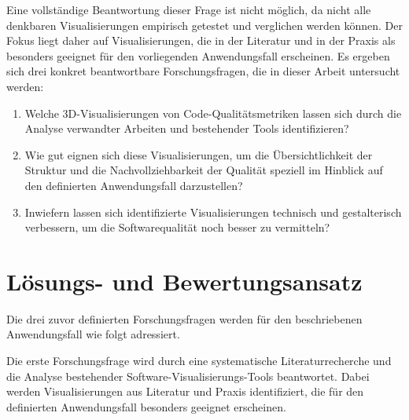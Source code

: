 Eine vollständige Beantwortung dieser Frage ist nicht möglich, da nicht alle denkbaren Visualisierungen empirisch getestet und verglichen werden können. Der Fokus liegt daher auf Visualisierungen, die in der Literatur und in der Praxis als besonders geeignet für den vorliegenden Anwendungsfall erscheinen. Es ergeben sich drei konkret beantwortbare Forschungsfragen, die in dieser Arbeit untersucht werden:
\begin{enumerate}
    \item Welche 3D-Visualisierungen von Code-Qualitätsmetriken lassen sich durch die Analyse verwandter Arbeiten und bestehender Tools identifizieren?
    \item Wie gut eignen sich diese Visualisierungen, um die Übersichtlichkeit der Struktur und die Nachvollziehbarkeit der Qualität speziell im Hinblick auf den definierten Anwendungsfall darzustellen?
    \item Inwiefern lassen sich identifizierte Visualisierungen technisch und gestalterisch verbessern, um die Softwarequalität noch besser zu vermitteln?
\end{enumerate}
\newpage
\section{Lösungs- und Bewertungsansatz} \label{sec:Bewertungsansatz}

Die drei zuvor definierten Forschungsfragen werden für den beschriebenen Anwendungsfall wie folgt adressiert.

Die erste Forschungsfrage wird durch eine systematische Literaturrecherche und die Analyse bestehender Software-Visualisierungs-Tools beantwortet. Dabei werden Visualisierungen aus Literatur und Praxis identifiziert, die für den definierten Anwendungsfall besonders geeignet erscheinen.

